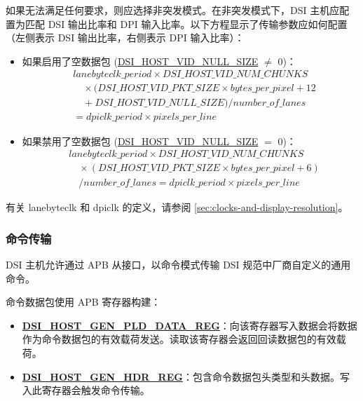\documentclass[main\_\_CN.tex]{subfiles}
\begin{document}
如果无法满足任何要求，则应选择非突发模式。在非突发模式下，DSI 主机应配置为匹配 DSI 输出比率和 DPI 输入比率。以下方程显示了传输参数应如何配置（左侧表示 DSI 输出比率，右侧表示 DPI 输入比率）：
\begin{itemize}
    \item 如果启用了空数据包 (\hyperref[fielddesc:DSIHOSTVIDNULLSIZE]{DSI\_HOST\_VID\_NULL\_SIZE} $\neq$ 0)：
    \begin{align*}
    & lanebyteclk\_period \times \hyperref[fielddesc:DSIHOSTVIDNUMCHUNKS]{DSI\_HOST\_VID\_NUM\_CHUNKS} \\
    & \quad \times (\hyperref[fielddesc:DSIHOSTVIDPKTSIZE]{DSI\_HOST\_VID\_PKT\_SIZE} \times bytes\_per\_pixel + 12 \\
    & \quad + \hyperref[fielddesc:DSIHOSTVIDNULLSIZE]{DSI\_HOST\_VID\_NULL\_SIZE}) / number\_of\_lanes \\
    &= dpiclk\_period \times pixels\_per\_line
    \end{align*}
    \item 如果禁用了空数据包 (\hyperref[fielddesc:DSIHOSTVIDNULLSIZE]{DSI\_HOST\_VID\_NULL\_SIZE} $=$ 0)：
    \begin{align*}
    & lanebyteclk\_period \times \hyperref[fielddesc:DSIHOSTVIDNUMCHUNKS]{DSI\_HOST\_VID\_NUM\_CHUNKS} \\
    & \quad \times (\hyperref[fielddesc:DSIHOSTVIDPKTSIZE]{DSI\_HOST\_VID\_PKT\_SIZE} \times bytes\_per\_pixel + 6) \\
    & \quad / number\_of\_lanes = dpiclk\_period \times pixels\_per\_line
    \end{align*}
\end{itemize}

有关 lanebyteclk 和 dpiclk 的定义，请参阅 \ref{sec:clocks-and-display-resolution}。

\subsubsection{命令传输}
\label{sec:command-transmission}
DSI 主机允许通过 APB 从接口，以命令模式传输 DSI 规范中厂商自定义的通用命令。

命令数据包使用 APB 寄存器构建：
\begin{itemize}
    \item \textbf{\hyperref[regdesc:DSIHOSTGENPLDDATAREG]{DSI\_HOST\_GEN\_PLD\_DATA\_REG}}：向该寄存器写入数据会将数据作为命令数据包的有效载荷发送。读取该寄存器会返回回读数据包的有效载荷。
    \item \textbf{\hyperref[regdesc:DSIHOSTGENHDRREG]{DSI\_HOST\_GEN\_HDR\_REG}}：包含命令数据包头类型和头数据。写入此寄存器会触发命令传输。
\end{itemize}
\end{document}
